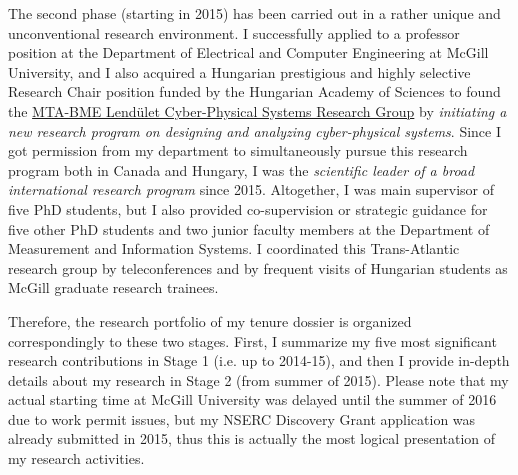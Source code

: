 The second phase (starting in 2015) has been carried out in a rather unique and unconventional research environment.  I successfully applied to a professor position at the Department of Electrical and Computer Engineering at McGill University, and I also acquired a Hungarian prestigious and highly selective Research Chair position funded by the Hungarian Academy of Sciences to found the \href{https://mta.hu/lendulet/az-mta-lendulet-kutatocsoport-halozata-105402}{MTA-BME Lendület Cyber-Physical Systems Research Group} by \emph{initiating a new research program on designing and analyzing cyber-physical systems}. Since I got permission from my department to simultaneously pursue this research program both in Canada and Hungary, I was the \emph{scientific leader of a broad international research program} since 2015.
Altogether, I was main supervisor of five PhD students, but I also provided co-supervision or strategic guidance for five other PhD students and two junior faculty members at the Department of Measurement and Information Systems. I coordinated this Trans-Atlantic research group by teleconferences and by frequent visits of Hungarian students as McGill graduate research trainees.



Therefore, the research portfolio of my tenure dossier is organized correspondingly to these two stages. First, I summarize 
my five most significant research contributions in Stage 1 (i.e. up to 2014-15), and then I provide in-depth details about my research in Stage 2 (from summer of 2015). Please note that my actual starting time at McGill University was delayed until the summer of 2016 due to work permit issues, but my NSERC Discovery Grant application was already submitted in 2015, thus this is actually the most logical presentation of my research activities. 

